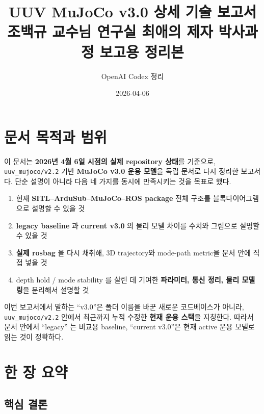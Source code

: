 \documentclass[11pt,a4paper]{article}
\title{UUV MuJoCo v3.0 상세 기술 보고서\\
\large 조백규 교수님 연구실 최애의 제자 박사과정 보고용 정리본}
\author{OpenAI Codex 정리}
\date{2026-04-06}
\newcommand{\code}[1]{\nolinkurl{#1}}
\begin{document}
\maketitle
\tableofcontents
\clearpage

\section{문서 목적과 범위}

이 문서는 \textbf{2026년 4월 6일 시점의 실제 repository 상태}를 기준으로, \code{uuv\_mujoco/v2.2} 기반 \textbf{MuJoCo v3.0 운용 모델}을 독립 문서로 다시 정리한 보고서다. 단순 설명이 아니라 다음 네 가지를 동시에 만족시키는 것을 목표로 했다.

\begin{enumerate}[leftmargin=2em]
  \item 현재 \textbf{SITL--ArduSub--MuJoCo--ROS package} 전체 구조를 블록다이어그램으로 설명할 수 있을 것
  \item \textbf{legacy baseline} 과 \textbf{current v3.0} 의 물리 모델 차이를 수치와 그림으로 설명할 수 있을 것
  \item \textbf{실제 rosbag} 을 다시 채취해, 3D trajectory와 mode-path metric을 문서 안에 직접 넣을 것
  \item depth hold / mode stability 를 살린 데 기여한 \textbf{파라미터, 통신 정리, 물리 모델링}을 분리해서 설명할 것
\end{enumerate}

이번 보고서에서 말하는 ``v3.0''은 폴더 이름을 바꾼 새로운 코드베이스가 아니라, \code{uuv\_mujoco/v2.2} 안에서 최근까지 누적 수정한 \textbf{현재 운용 스택}을 지칭한다. 따라서 문서 안에서 ``legacy'' 는 비교용 baseline, ``current v3.0''은 현재 active 운용 모델로 읽는 것이 정확하다.

\section{한 장 요약}

\subsection{핵심 결론}
\end{document}
